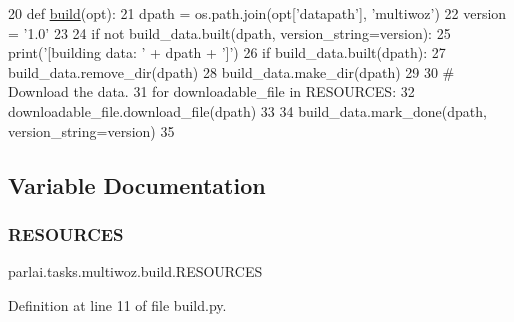 \begin{DoxyCode}
20 \textcolor{keyword}{def }\hyperlink{namespacedialog__babi__feedback_1_1build_a7a9d289f7493a5ded13c4b7f071b6184}{build}(opt):
21     dpath = os.path.join(opt[\textcolor{stringliteral}{'datapath'}], \textcolor{stringliteral}{'multiwoz'})
22     version = \textcolor{stringliteral}{'1.0'}
23 
24     \textcolor{keywordflow}{if} \textcolor{keywordflow}{not} build\_data.built(dpath, version\_string=version):
25         print(\textcolor{stringliteral}{'[building data: '} + dpath + \textcolor{stringliteral}{']'})
26         \textcolor{keywordflow}{if} build\_data.built(dpath):
27             build\_data.remove\_dir(dpath)
28         build\_data.make\_dir(dpath)
29 
30         \textcolor{comment}{# Download the data.}
31         \textcolor{keywordflow}{for} downloadable\_file \textcolor{keywordflow}{in} RESOURCES:
32             downloadable\_file.download\_file(dpath)
33 
34         build\_data.mark\_done(dpath, version\_string=version)
35 \end{DoxyCode}


\subsection{Variable Documentation}
\mbox{\label{namespaceparlai_1_1tasks_1_1multiwoz_1_1build_a7fa5e9b5c2aed52202c27a6f5b2adea2}} 
\subsubsection{\texorpdfstring{R\+E\+S\+O\+U\+R\+C\+ES}{RESOURCES}}
{\footnotesize\ttfamily parlai.\+tasks.\+multiwoz.\+build.\+R\+E\+S\+O\+U\+R\+C\+ES}



Definition at line 11 of file build.\+py.

